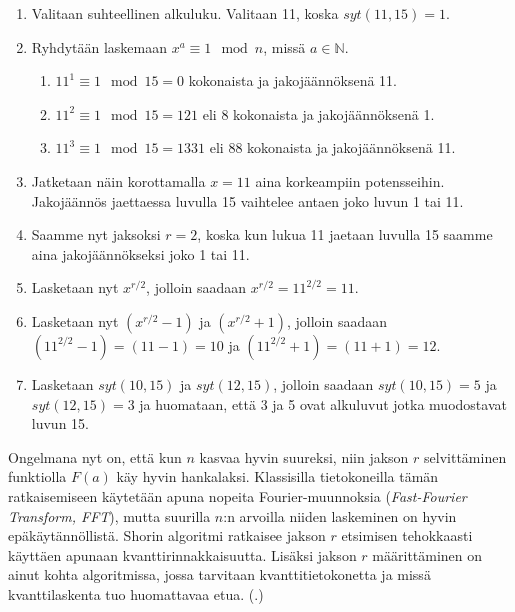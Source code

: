 \begin{enumerate}
    \item Valitaan suhteellinen alkuluku. Valitaan 11, koska $syt(11,15) = 1$.
    
    \item Ryhdytään laskemaan $x^{a} \equiv 1 \mod n$, missä $a \in \mathbb{N}$.
    
    \begin{enumerate}
    
        \item $11^{1} \equiv 1 \mod 15 = 0$ kokonaista ja jakojäännöksenä 11.
        
        \item $11^{2} \equiv 1 \mod 15 = 121$ eli 8 kokonaista ja jakojäännöksenä 1.
        
        \item $11^{3} \equiv 1 \mod 15 = 1331$ eli 88 kokonaista ja jakojäännöksenä 11.
    \end{enumerate}
    
    \item Jatketaan näin korottamalla $x = 11$ aina korkeampiin potensseihin. Jakojäännös jaettaessa luvulla 15 vaihtelee antaen joko luvun 1 tai 11.
    
    \item Saamme nyt jaksoksi $r = 2$, koska kun lukua 11 jaetaan luvulla 15 saamme aina jakojäännökseksi joko 1 tai 11.
    
    \item Lasketaan nyt $x^{r/2}$, jolloin saadaan $x^{r/2} = 11^{2/2} = 11$.
    
    \item Lasketaan nyt $(x^{r/2}-1)$ ja $(x^{r/2}+1)$, jolloin saadaan $(11^{2/2} - 1) = (11 - 1) = 10$ ja $(11^{2/2} + 1) = (11 + 1) = 12$.
    
    \item Lasketaan $syt(10,15)$ ja $syt(12,15)$, jolloin saadaan $syt(10,15) = 5$ ja $syt(12,15) = 3$ ja huomataan, että 3 ja 5 ovat alkuluvut jotka muodostavat luvun 15.
    
\end{enumerate}

Ongelmana nyt on, että kun $n$ kasvaa hyvin suureksi, niin jakson $r$ selvittäminen funktiolla $F(a)$ käy hyvin hankalaksi. Klassisilla tietokoneilla tämän ratkaisemiseen käytetään apuna nopeita Fourier-muunnoksia (\emph{Fast-Fourier Transform, FFT}), mutta suurilla $n$:n arvoilla niiden laskeminen on hyvin epäkäytännöllistä. Shorin algoritmi ratkaisee jakson $r$ etsimisen tehokkaasti käyttäen apunaan kvanttirinnakkaisuutta. Lisäksi jakson $r$ määrittäminen on ainut kohta algoritmissa, jossa tarvitaan kvanttitietokonetta ja missä kvanttilaskenta tuo huomattavaa etua. (\cite{doi:10.1080/23742917.2016.1226650}.)

